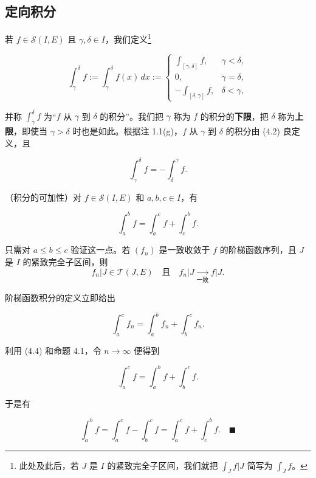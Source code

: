 \subsection*{定向积分}

若 $ f \in \mathcal{S}(I, E) $ 且 $ \gamma, \delta \in I $，我们定义\footnote{此处及此后，若 $ J $ 是 $ I $ 的紧致完全子区间，我们就把 $ \int_{J} f|J $ 简写为 $ \int_{J} f $。}

\begin{equation}
\int_{\gamma}^{\delta} f := \int_{\gamma}^{\delta} f(x) \, dx := \begin{cases} \int_{[\gamma, \delta]} f , & \gamma < \delta , \\ 0, & \gamma = \delta , \\ -\int_{[\delta, \gamma]} f , & \delta < \gamma , \end{cases}\tag{4.2}
\end{equation}

并称 $ \int_{\gamma}^{\delta} f $ 为“$ f $ 从 $ \gamma $ 到 $ \delta $ 的积分”。我们把 $ \gamma $ 称为 $ f $ 的积分的\textbf{下限}，把 $ \delta $ 称为\textbf{上限}，即使当 $ \gamma > \delta $ 时也是如此。根据注 1.1(g)，$ f $ 从 $ \gamma $ 到 $ \delta $ 的积分由 (4.2) 良定义，且

\begin{equation}
\int_{\gamma}^{\delta} f = -\int_{\delta}^{\gamma} f .\tag{4.3}
\end{equation}

\begin{proposition}

（积分的可加性）对 $ f \in \mathcal{S}(I, E) $ 和 $ a, b, c \in I $，有

\[
\int_{a}^{b} f = \int_{a}^{c} f + \int_{c}^{b} f .
\]

\proofhead
只需对 $ a \le b \le c $ 验证这一点。若 $ (f_n) $ 是一致收敛于 $ f $ 的阶梯函数序列，且 $ J $ 是 $ I $ 的紧致完全子区间，则
\begin{equation}
f_n|J \in \mathcal{T}(J, E) \quad \text{且} \quad f_n|J \xrightarrow[\text{一致}]{} f|J .\tag{4.4}
\end{equation}

阶梯函数积分的定义立即给出

\begin{equation}
\int_{a}^{c} f_n = \int_{a}^{b} f_n + \int_{b}^{c} f_n .\tag{4.5}
\end{equation}

利用 (4.4) 和命题 4.1，令 $ n \to \infty $ 便得到

\[
\int_{a}^{c} f = \int_{a}^{b} f + \int_{b}^{c} f .
\]

于是有

\[
\int_{a}^{b} f = \int_{a}^{c} f - \int_{b}^{c} f = \int_{a}^{c} f + \int_{c}^{b} f .\quad\blacksquare
\]
\end{proposition}

